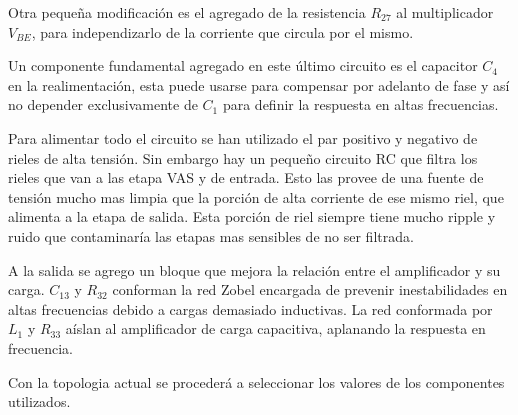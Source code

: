 Otra pequeña modificación es el agregado de la resistencia $R_{27}$ al multiplicador $V_{BE}$, para independizarlo de la corriente que circula por el mismo.

Un componente fundamental agregado en este último circuito es el capacitor $C_4$ en la realimentación, esta puede usarse para compensar por adelanto de fase y así no depender exclusivamente de $C_1$ para definir la respuesta en altas frecuencias.

Para alimentar todo el circuito se han utilizado el par positivo y negativo de rieles de alta tensión. Sin embargo hay un pequeño circuito RC que filtra los rieles que van a las etapa VAS y de entrada. Esto las provee de una fuente de tensión mucho mas limpia que la porción de alta corriente de ese mismo riel, que alimenta a la etapa de salida. Esta porción de riel siempre tiene mucho ripple y ruido que contaminaría las etapas mas sensibles de no ser filtrada.

A la salida se agrego un bloque que mejora la relación entre el amplificador y su carga. $C_{13}$ y $R_{32}$ conforman la red Zobel encargada de prevenir inestabilidades en altas frecuencias debido a cargas demasiado inductivas. La red conformada por $L_{1}$ y $R_{33}$ aíslan al amplificador de carga capacitiva, aplanando la respuesta en frecuencia.

Con la topologia actual se procederá a seleccionar los valores de los componentes utilizados. 
\medskip




